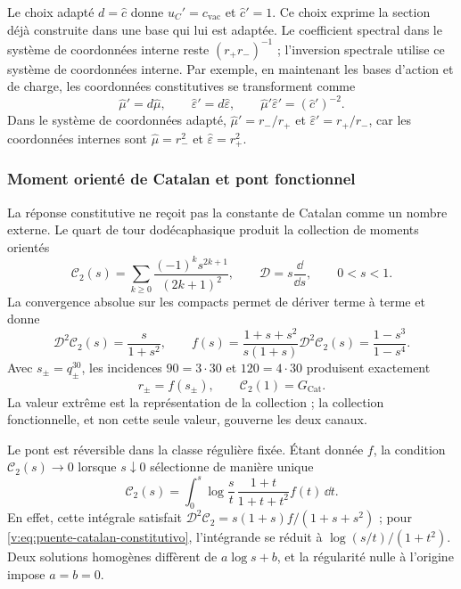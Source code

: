 Le choix adapté $d=\widehat c$ donne $u_C'=c_{\mathrm{vac}}$ et
$\widehat c'=1$. Ce choix exprime la section déjà construite dans une
base qui lui est adaptée. Le coefficient spectral dans le système de coordonnées interne reste
$(r_+r_-)^{-1}$ ; l’inversion spectrale utilise ce système de coordonnées interne.
Par exemple, en maintenant les bases d’action et de charge, les coordonnées
constitutives se transforment comme
\[
 \widehat\mu'=d\widehat\mu,
 \qquad \widehat\varepsilon'=d\widehat\varepsilon,
 \qquad
 \widehat\mu'\widehat\varepsilon'=(\widehat c')^{-2}.
\]
Dans le système de coordonnées adapté, $\widehat\mu'=r_-/r_+$ et
$\widehat\varepsilon'=r_+/r_-$, car les coordonnées internes sont
$\widehat\mu=r_-^2$ et $\widehat\varepsilon=r_+^2$.

\subsubsection{Moment orienté de Catalan et pont fonctionnel}

La réponse constitutive ne reçoit pas la constante de Catalan comme un
nombre externe. Le quart de tour dodécaphasique produit la collection de
moments orientés
\begin{equation}
 \mathcal C_2(s)=\sum_{k\geq0}
 \frac{(-1)^ks^{2k+1}}{(2k+1)^2},\qquad
 \mathcal D=s\frac{\dd}{\dd s},\qquad 0<s<1.
 \label{v:eq:momento-catalan}
\end{equation}
La convergence absolue sur les compacts permet de dériver terme à terme et
donne
\begin{equation}
 \mathcal D^2\mathcal C_2(s)=\frac{s}{1+s^2},\qquad
 f(s)=\frac{1+s+s^2}{s(1+s)}\mathcal D^2\mathcal C_2(s)
 =\frac{1-s^3}{1-s^4}.
 \label{v:eq:puente-catalan-constitutivo}
\end{equation}
Avec $s_\pm=q_\pm^{30}$, les incidences $90=3\cdot30$ et
$120=4\cdot30$ produisent exactement
\begin{equation}
 r_\pm=f(s_\pm),\qquad
 \mathcal C_2(1)=G_{\mathrm{Cat}}.
 \label{v:eq:catalan-canales}
\end{equation}
La valeur extrême est la représentation de la collection ; la collection fonctionnelle,
et non cette seule valeur, gouverne les deux canaux.

Le pont est réversible dans la classe régulière fixée. Étant donnée $f$, la
condition $\mathcal C_2(s)\to0$ lorsque $s\downarrow0$ sélectionne
de manière unique
\begin{equation}
 \mathcal C_2(s)=\int_0^s\log\frac{s}{t}\,
 \frac{1+t}{1+t+t^2}f(t)\,\dd t.
 \label{v:eq:restitucion-funcional-catalan}
\end{equation}
En effet, cette intégrale satisfait
$\mathcal D^2\mathcal C_2=s(1+s)f/(1+s+s^2)$ ; pour
\eqref{v:eq:puente-catalan-constitutivo}, l’intégrande se réduit à
$\log(s/t)/(1+t^2)$. Deux solutions homogènes diffèrent de
$a\log s+b$, et la régularité nulle à l’origine impose $a=b=0$.

